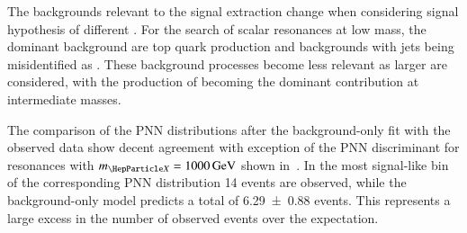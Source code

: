 \begin{table}[htbp]
  \centering

  \caption{Expected number of events per physics process in the \hadhad SR for
    signal-like bins of the PNN discriminant after the background-only fit to
    observed data in all regions. The two most signal-like bins are shown for
    $\mX = \SI{300}{\GeV}$ and \SI{500}{\GeV}. $\dagger$: The large
    discrimination power of the PNN for large \mX leads to a small number of
    bins for the statistical interpretation due to the choice of re-binning
    algorithm. Therefore, the expected number of events is shown only for the
    most signal-like bin for $\mX = \SI{1000}{\GeV}$ and \SI{1600}{\GeV}.}%
  \label{tab:yields_postfit_resonant}

  \resizebox{\textwidth}{!}{%
    
  }
\end{table}

The backgrounds relevant to the signal extraction change when considering signal
hypothesis of different \mX. For the search of scalar resonances at low mass,
the dominant background are top quark production and backgrounds with jets being
misidentified as \tauhadvis. These background processes become less relevant as
larger \mX are considered, with the production of \Zjets becoming the dominant
contribution at intermediate masses.

The comparison of the PNN distributions after the background-only fit with the
observed data show decent agreement with exception of the PNN discriminant for
resonances with $\mX = \SI{1000}{\GeV}$ shown in~. In
the most signal-like bin of the corresponding PNN distribution 14 events are
observed, while the background-only model predicts a total of \num{6.29 +- 0.88}
events. This represents a large excess in the number of observed events over the
expectation.

